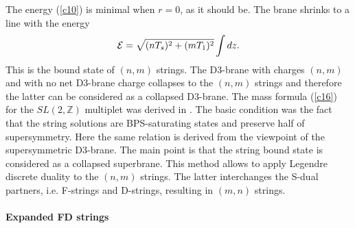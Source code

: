 \documentclass[a4paper,12pt]{article}
\begin{document}
\noindent

The energy (\ref{c10}) is minimal when $r=0$, as it should be. The brane 
shrinks to a line with the energy
\begin{equation}
{\cal E}=\sqrt{(nT_s)^2+(mT_1)^2}\int dz.
\label{c16}
\end{equation}
This is the bound state of $(n,m)$ strings. The D3-brane with charges $(n,m)$ 
and with no net D3-brane charge collapses to the $(n,m)$ strings and 
therefore the latter can be considered as a collapsed D3-brane. The mass 
formula (\ref{c16}) for the $SL(2,\mathbb{Z})$ multiplet was derived in 
\cite{17,20}. 
The basic condition was the fact that the string solutions are BPS-saturating 
states and preserve half of supersymmetry. Here the same relation is derived 
from the viewpoint of the supersymmetric D3-brane. The main point is that the 
string bound state is considered as a collapsed superbrane. This 
method allows to apply Legendre discrete duality to the $(n, m)$ strings. 
The latter interchanges the S-dual partners, i.e. F-strings and D-strings, 
resulting in $(m,n)$ strings.
\paragraph{Expanded FD strings}

\noindent
\end{document}
